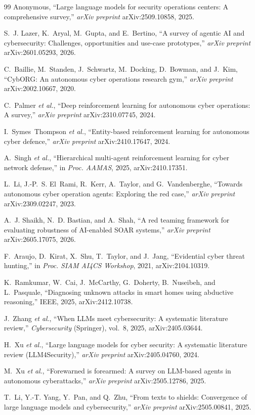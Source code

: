 \begin{singlespace}
\begin{thebibliography}{99}
Anonymous, ``Large language models for security operations centers: A comprehensive
survey,'' \emph{arXiv preprint} arXiv:2509.10858, 2025.

S.~J. Lazer, K.~Aryal, M.~Gupta, and E.~Bertino, ``A survey of agentic AI and
cybersecurity: Challenges, opportunities and use-case prototypes,''
\emph{arXiv preprint} arXiv:2601.05293, 2026.

C.~Baillie, M.~Standen, J.~Schwartz, M.~Docking, D.~Bowman, and J.~Kim,
``CybORG: An autonomous cyber operations research gym,'' \emph{arXiv preprint}
arXiv:2002.10667, 2020.

C.~Palmer \emph{et al.}, ``Deep reinforcement learning for autonomous cyber
operations: A survey,'' \emph{arXiv preprint} arXiv:2310.07745, 2024.

I.~Symes~Thompson \emph{et al.}, ``Entity-based reinforcement learning for
autonomous cyber defence,'' \emph{arXiv preprint} arXiv:2410.17647, 2024.

A.~Singh \emph{et al.}, ``Hierarchical multi-agent reinforcement learning for
cyber network defense,'' in \emph{Proc. AAMAS}, 2025, arXiv:2410.17351.

L.~Li, J.-P.~S. El~Rami, R.~Kerr, A.~Taylor, and G.~Vandenberghe, ``Towards
autonomous cyber operation agents: Exploring the red case,'' \emph{arXiv
preprint} arXiv:2309.02247, 2023.

A.~J. Shaikh, N.~D. Bastian, and A.~Shah, ``A red teaming framework for
evaluating robustness of AI-enabled SOAR systems,'' \emph{arXiv preprint}
arXiv:2605.17075, 2026.

F.~Araujo, D.~Kirat, X.~Shu, T.~Taylor, and J.~Jang, ``Evidential cyber threat
hunting,'' in \emph{Proc. SIAM AI4CS Workshop}, 2021, arXiv:2104.10319.

K.~Ramkumar, W.~Cai, J.~McCarthy, G.~Doherty, B.~Nuseibeh, and L.~Pasquale,
``Diagnosing unknown attacks in smart homes using abductive reasoning,'' IEEE,
2025, arXiv:2412.10738.

J.~Zhang \emph{et al.}, ``When LLMs meet cybersecurity: A systematic literature
review,'' \emph{Cybersecurity} (Springer), vol.~8, 2025, arXiv:2405.03644.

H.~Xu \emph{et al.}, ``Large language models for cyber security: A systematic
literature review (LLM4Security),'' \emph{arXiv preprint} arXiv:2405.04760, 2024.

M.~Xu \emph{et al.}, ``Forewarned is forearmed: A survey on LLM-based agents in
autonomous cyberattacks,'' \emph{arXiv preprint} arXiv:2505.12786, 2025.

T.~Li, Y.-T. Yang, Y.~Pan, and Q.~Zhu, ``From texts to shields: Convergence of
large language models and cybersecurity,'' \emph{arXiv preprint}
arXiv:2505.00841, 2025.

\end{thebibliography}
\end{singlespace}
